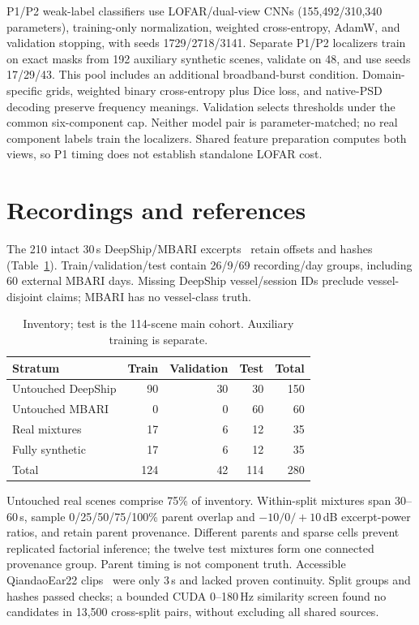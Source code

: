 \documentclass[runningheads,orivec]{llncs}
\begin{document}
P1/P2 weak-label classifiers use LOFAR/dual-view CNNs (155,492/310,340 parameters), training-only normalization, weighted cross-entropy, AdamW, and validation stopping, with seeds 1729/2718/3141. Separate P1/P2 localizers train on exact masks from 192 auxiliary synthetic scenes, validate on 48, and use seeds 17/29/43. This pool includes an additional broadband-burst condition. Domain-specific grids, weighted binary cross-entropy plus Dice loss, and native-PSD decoding preserve frequency meanings. Validation selects thresholds under the common six-component cap. Neither model pair is parameter-matched; no real component labels train the localizers. Shared feature preparation computes both views, so P1 timing does not establish standalone LOFAR cost.

\section{Recordings and references}
The 210 intact 30\,s DeepShip/MBARI excerpts~\cite{deepshipdata,mbari} retain offsets and hashes (Table~\ref{tab:data}). Train/validation/test contain 26/9/69 recording/day groups, including 60 external MBARI days. Missing DeepShip vessel/session IDs preclude vessel-disjoint claims; MBARI has no vessel-class truth.

\begin{table}[tb]
\caption{Inventory; test is the 114-scene main cohort. Auxiliary training is separate.}
\label{tab:data}\centering\small
\begin{tabular}{@{}lrrrr@{}}\toprule
Stratum & Train & Validation & Test & Total \\\midrule
Untouched DeepShip & 90 & 30 & 30 & 150 \\
Untouched MBARI & 0 & 0 & 60 & 60 \\
Real mixtures & 17 & 6 & 12 & 35 \\
Fully synthetic & 17 & 6 & 12 & 35 \\\midrule
Total & 124 & 42 & 114 & 280 \\\bottomrule
\end{tabular}
\end{table}

Untouched real scenes comprise 75\% of inventory. Within-split mixtures span 30--60\,s, sample 0/25/50/75/100\% parent overlap and $-10/0/+10$\,dB excerpt-power ratios, and retain parent provenance. Different parents and sparse cells prevent replicated factorial inference; the twelve test mixtures form one connected provenance group. Parent timing is not component truth. Accessible QiandaoEar22 clips~\cite{du2024qiandao} were only 3\,s and lacked proven continuity. Split groups and hashes passed checks; a bounded CUDA 0--180\,Hz similarity screen found no candidates in 13,500 cross-split pairs, without excluding all shared sources.
\end{document}
